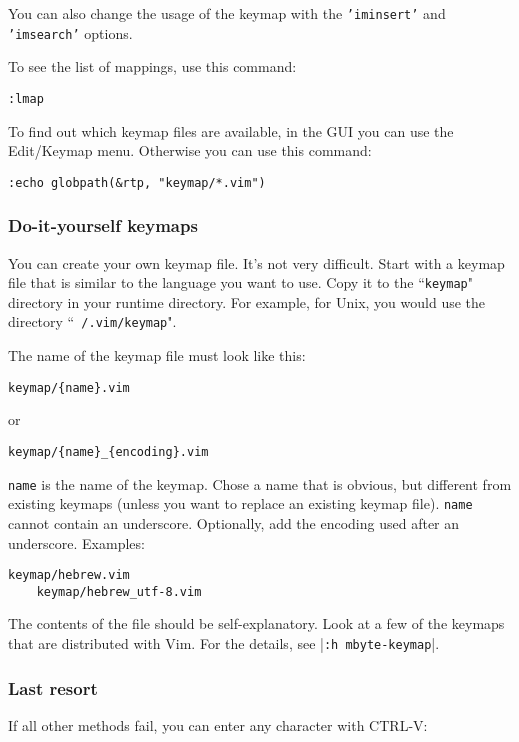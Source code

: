 You can also change the usage of the keymap with the \texttt{'iminsert'} and \texttt{'imsearch'} options.

To see the list of mappings, use this command:

\begin{Verbatim}[samepage=true]
 :lmap
\end{Verbatim}

To find out which keymap files are available, in the GUI you can use the Edit/Keymap menu.
Otherwise you can use this command:

\begin{Verbatim}[samepage=true]
 :echo globpath(&rtp, "keymap/*.vim")
\end{Verbatim}

\subsubsection{Do-it-yourself keymaps}
You can create your own keymap file.
It's not very difficult.
Start with a keymap file that is similar to the language you want to use.
Copy it to the ``\texttt{keymap}" directory in your runtime directory.
For example, for Unix, you would use the directory ``\texttt{~/.vim/keymap}".

The name of the keymap file must look like this:

\begin{Verbatim}[samepage=true]
    keymap/{name}.vim
\end{Verbatim}
or
\begin{Verbatim}[samepage=true]
    keymap/{name}_{encoding}.vim
\end{Verbatim}

\texttt{{name}} is the name of the keymap.
Chose a name that is obvious, but different from existing keymaps (unless you want to replace an existing keymap file).
\texttt{{name}} cannot contain an underscore.
Optionally, add the encoding used after an underscore.
Examples:

\begin{Verbatim}[samepage=true]
    keymap/hebrew.vim
    keymap/hebrew_utf-8.vim
\end{Verbatim}

The contents of the file should be self-explanatory.
Look at a few of the keymaps that are distributed with Vim.
For the details, see |\texttt{:h mbyte-keymap}|.

\subsubsection{Last resort}
If all other methods fail, you can enter any character with CTRL-V:

